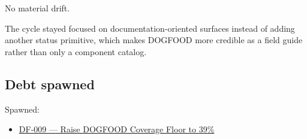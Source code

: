 No material drift.

The cycle stayed focused on documentation-oriented surfaces instead of adding another status primitive, which makes DOGFOOD more credible as a field guide rather than only a component catalog.

\subsection{Debt spawned}\label{record-070-debt-spawned}

Spawned:

\begin{itemize}
\tightlist
\item
  \href{https://github.com/flyingrobots/bijou/blob/cbd70612140e7a450d764b3c7be1c6af878b99bc/docs/design/DF-009-raise-dogfood-coverage-floor-to-39-percent.md}{DF-009 --- Raise DOGFOOD Coverage Floor to 39\%}
\end{itemize}

